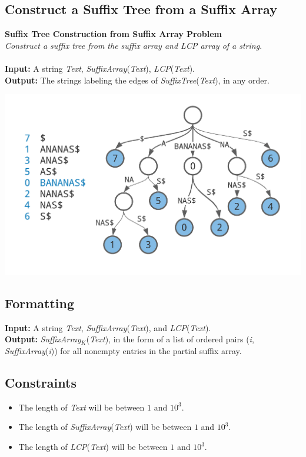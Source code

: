 \documentclass{article}
\begin{document}
\subsection{Construct a Suffix Tree from a Suffix Array}
\hline\vspace{5}
\noindent \textbf{Suffix Tree Construction from Suffix Array Problem}\\
\emph{Construct a suffix tree from the suffix array and LCP array of a string}.\\ \\
\textbf{Input:} A string \emph{Text}, \emph{SuffixArray}(\emph{Text}), \emph{LCP}(\emph{Text}).\\
\textbf{Output:} The strings labeling the edges of \emph{SuffixTree}(\emph{Text}), in any order.
\begin{center}
    \includegraphics[scale=0.2]{logos/9R.png} 
\end{center}
\hline\vspace{5}

\subsection*{Formatting}
\textbf{Input:} A string \emph{Text}, \emph{SuffixArray}(\emph{Text}), and \emph{LCP}(\emph{Text}).\\
\noindent \textbf{Output:} \emph{SuffixArray}$_K$(\emph{Text}), in the form of a list of ordered pairs (\emph{i}, \emph{SuffixArray}(\emph{i})) for all nonempty entries in the partial suffix array.

\subsection*{Constraints}
\begin{itemize}
    \item The length of \emph{Text} will be between $1$ and $10^3$.
    \item The length of \emph{SuffixArray}(\emph{Text}) will be between $1$ and $10^3$.
    \item The length of \emph{LCP}(\emph{Text}) will be between $1$ and $10^3$.
\end{itemize}
\pagebreak
\end{document}
